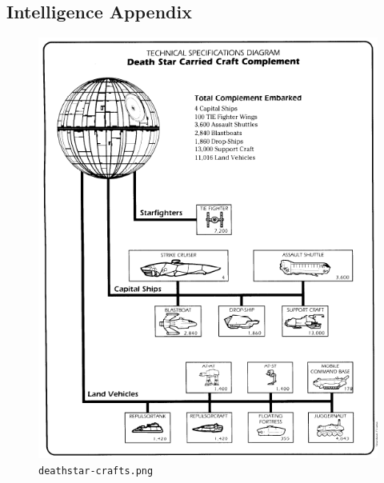 \documentclass{article}
\begin{document}
\begin{appendices}
\section{Intelligence Appendix}
\label{appendix:intelligence}

\begin{figure}[H]
	\includegraphics[width=\linewidth]{resources/plans/deathstar-crafts.png}
	\caption{\texttt{deathstar-crafts.png}}
	\label{fig:deathstar_crafts}
\end{figure}


\end{appendices}
\end{document}
